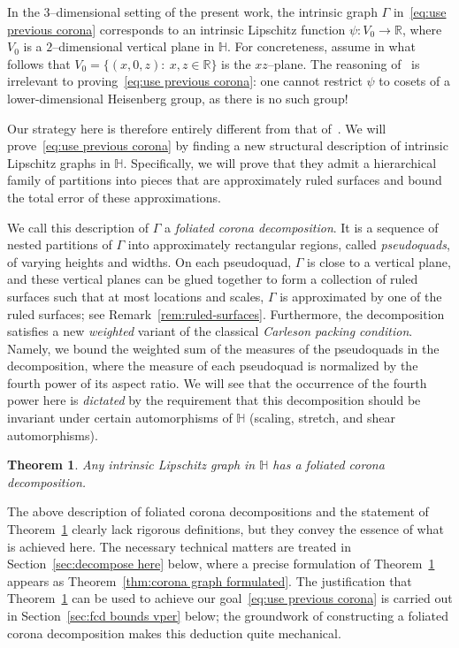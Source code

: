\documentclass[11pt,reqno]{amsart}
\renewcommand{\H}{\mathbb{H}}
\newcommand{\R}{\mathbb{R}}
\newcommand{\0}{\mathbf{0}}
\renewcommand{\1}{\mathbf 1}
\newcommand{\from}{\colon}
\newtheorem{thm}{Theorem}[section]
\theoremstyle{remark}
\begin{document}
In the  $3$--dimensional setting of the present work, the intrinsic graph $\Gamma$ in~\eqref{eq:use previous corona} corresponds to an intrinsic Lipschitz function $\psi\from V_0\to \R$, where $V_0$ is a $2$--dimensional vertical plane in $\H$. For concreteness, assume in what follows that $V_0=\{(x,0,z):\ x,z\in \R\}$ is the $xz$--plane.  The reasoning of~\cite{NY18} is irrelevant to proving~\eqref{eq:use previous corona}: one cannot restrict $\psi$ to cosets of a lower-dimensional Heisenberg group, as there is no such group!

Our strategy here is therefore entirely different from that of~\cite{NY18}. We will prove~\eqref{eq:use previous corona} by finding a new structural  description of intrinsic Lipschitz graphs in $\H$.  Specifically, we will prove that they admit a hierarchical family of partitions into pieces that are approximately ruled surfaces and bound the total error of these approximations.

We call this description of $\Gamma$ a \emph{foliated corona decomposition}.  It is a sequence of nested partitions of $\Gamma$ into approximately rectangular regions, called \emph{pseudoquads}, of varying heights and widths.  On each pseudoquad, $\Gamma$ is close to a vertical plane, and these vertical planes can be glued together to form a collection of ruled surfaces such that at most locations and scales, $\Gamma$ is approximated by one of the ruled surfaces; see Remark~\ref{rem:ruled-surfaces}.  Furthermore, the decomposition satisfies a new {\em weighted} variant of the classical  \emph{Carleson packing condition}.  Namely, we bound the weighted sum of the measures of the pseudoquads in the decomposition, where the measure of each pseudoquad is normalized by the fourth power of its aspect ratio.  We will see that the occurrence of the fourth power here is {\em dictated} by the requirement that this decomposition should be invariant under certain automorphisms of $\H$ (scaling, stretch, and shear automorphisms).

\begin{thm}\label{thm:ilg admits fcd intro}
  Any intrinsic Lipschitz graph in $\H$ has a foliated corona decomposition.
\end{thm}
The above description of foliated corona decompositions and the statement of Theorem~\ref{thm:ilg admits fcd intro} clearly lack rigorous definitions, but they convey the essence of what is achieved here. The necessary  technical matters are treated  in Section~\ref{sec:decompose here} below, where a precise formulation of  Theorem~\ref{thm:ilg admits fcd intro}  appears as Theorem~\ref{thm:corona graph formulated}. The justification that Theorem~\ref{thm:ilg admits fcd intro} can be used to achieve our goal~\eqref{eq:use previous corona} is carried out in Section~\ref{sec:fcd bounds vper} below; the groundwork of constructing a foliated corona decomposition makes this deduction quite mechanical.
\end{document}
